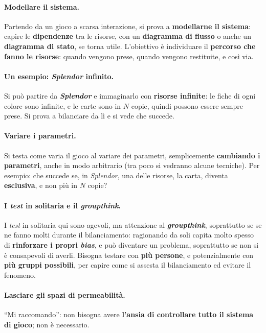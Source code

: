 \paragraph{Modellare il sistema.} Partendo da un gioco a scarsa interazione, si prova a
\textbf{modellarne il sistema}: capire le \textbf{dipendenze} tra le risorse, con un
\textbf{diagramma di flusso} o anche un \textbf{diagramma di stato}, se torna utile.
L'obiettivo è individuare il \textbf{percorso che fanno le risorse}: quando vengono prese,
quando vengono restituite, e così via.

\paragraph{Un esempio: \emph{Splendor} infinito.} Si può partire da \textbf{\emph{Splendor}} e
immaginarlo con \textbf{risorse infinite}: le fiche di ogni colore sono infinite, e le carte
sono in $N$ copie, quindi possono essere sempre prese. Si prova a bilanciare da lì e si vede
che succede.

\paragraph{Variare i parametri.} Si testa come varia il gioco al variare dei parametri,
semplicemente \textbf{cambiando i parametri}, anche in modo arbitrario (tra poco si vedranno
alcune tecniche). Per esempio: che succede se, in \emph{Splendor}, una delle risorse, la
carta, diventa \textbf{esclusiva}, e non più in $N$ copie?

\paragraph{I \emph{test} in solitaria e il \emph{groupthink}.} I \emph{test} in solitaria qui
sono agevoli, ma attenzione al \textbf{\emph{groupthink}}, soprattutto se se ne fanno molti
durante il bilanciamento: ragionando da soli capita molto spesso di \textbf{rinforzare i
propri \emph{bias}}, e può diventare un problema, soprattutto se non si è consapevoli di
averli. Bisogna testare con \textbf{più persone}, e potenzialmente con \textbf{più gruppi
possibili}, per capire come si assesta il bilanciamento ed evitare il fenomeno.

\paragraph{Lasciare gli spazi di permeabilità.} ``Mi raccomando'': non bisogna avere
\textbf{l'ansia di controllare tutto il sistema di gioco}; non è necessario.

